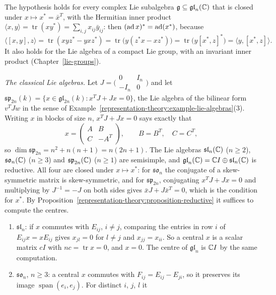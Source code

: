 The hypothesis holds for every complex Lie subalgebra $\mathfrak{g} \subseteq \mathfrak{gl}_n(\mathbb{C})$ that is closed under $x \mapsto x^* = \bar x^T$, with the Hermitian inner product
$\langle x, y\rangle = \operatorname{tr}(xy^*) = \sum_{i,j}x_{ij}\bar y_{ij}$: then $(\operatorname{ad} x)^* = \operatorname{ad}(x^*)$, because
\[
\langle[x, y], z\rangle = \operatorname{tr}(xyz^* - yxz^*) = \operatorname{tr}\bigl(y(z^*x - xz^*)\bigr) = \operatorname{tr}\bigl(y[x^*, z]^*\bigr) = \langle y, [x^*, z]\rangle .
\]
It also holds for the Lie algebra of a compact Lie group, with an invariant inner product (Chapter~\ref{lie-groups}).

\begin{example}\label{representation-theory:example-classical}
\emph{The classical Lie algebras.} Let $J = \bigl(\begin{smallmatrix}0 & I_n\\ -I_n & 0\end{smallmatrix}\bigr)$ and let $\mathfrak{sp}_{2n}(k) = \{x \in \mathfrak{gl}_{2n}(k) : x^TJ + Jx
= 0\}$, the Lie algebra of the bilinear form $v^TJw$ in the sense of Example~\ref{representation-theory:example-lie-algebras}(3). Writing $x$ in blocks of size $n$,
$x^TJ + Jx = 0$ says exactly that
\[
x = \begin{pmatrix}A & B\\ C & -A^T\end{pmatrix}, \qquad B = B^T, \quad C = C^T,
\]
so $\dim\mathfrak{sp}_{2n} = n^2 + n(n+1) = n(2n + 1)$. The Lie algebras $\mathfrak{sl}_n(\mathbb{C})$ ($n \geq 2$), $\mathfrak{so}_n(\mathbb{C})$ ($n \geq 3$) and $\mathfrak{sp}_{2n}(\mathbb{C})$
($n \geq 1$) are semisimple, and $\mathfrak{gl}_n(\mathbb{C}) = \mathbb{C} I \oplus \mathfrak{sl}_n(\mathbb{C})$ is reductive. All four are closed under $x \mapsto x^*$: for $\mathfrak{so}_n$ the
conjugate of a skew-symmetric matrix is skew-symmetric, and for $\mathfrak{sp}_{2n}$, conjugating $x^TJ + Jx = 0$ and multiplying by $J^{-1} = -J$ on both sides gives
$\bar xJ + J\bar x^T = 0$, which is the condition for $x^*$. By Proposition~\ref{representation-theory:proposition-reductive} it suffices to compute the centres.
\begin{enumerate}
\item $\mathfrak{sl}_n$: if $x$ commutes with $E_{ij}$, $i \neq j$, comparing the entries in row $i$ of $E_{ij}x = xE_{ij}$ gives $x_{jl} = 0$ for $l \neq j$ and $x_{jj} = x_{ii}$.
So a central $x$ is a scalar matrix $cI$ with $nc = \operatorname{tr}x = 0$, and $x = 0$. The centre of $\mathfrak{gl}_n$ is $\mathbb{C} I$ by the same computation.
\item $\mathfrak{so}_n$, $n \geq 3$: a central $x$ commutes with $F_{ij} = E_{ij} - E_{ji}$, so it preserves its image $\operatorname{span}(e_i, e_j)$. For distinct $i$, $j$, $l$ it

\end{enumerate}
\end{example}
